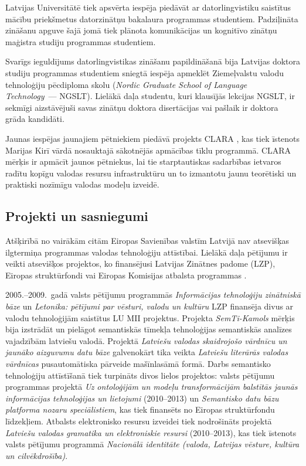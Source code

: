 \begin{multicols}{2}
Latvijas Universitātē tiek apsvērta iespēja piedāvāt ar datorlingvistiku saistītus mācību priekšmetus datorzinātņu bakalaura programmas studentiem. 
Padziļināta zināšanu apguve šajā jomā tiek plānota komunikācijas un kognitīvo zinātņu maģistra studiju programmas studentiem.

Svarīgs ieguldījums datorlingvistikas zināšanu papildināšanā bija Latvijas doktora studiju programmas studentiem sniegtā iespēja apmeklēt Ziemeļvalstu valodu tehnoloģiju pēcdiploma skolu (\textit{Nordic Graduate School of Language Technology}~--- NGSLT). Lielākā daļa studentu, kuri klausījās lekcijas NGSLT, ir sekmīgi aizstāvējuši savas zinātņu doktora disertācijas vai pašlaik ir doktora grāda kandidāti.

Jaunas iespējas jaunajiem pētniekiem piedāvā projekts CLARA \cite{Meta38}, kas tiek īstenots Marijas Kirī vārdā nosauktajā sākotnējās apmācības tīklu pro\-grammā. 
CLARA mērķis ir apmācīt jaunos pētniekus, lai tie starptautiskas sadarbības ietvaros radītu kopīgu valodas resursu infrastruktūru un to izmantotu jaunu teorētiski un praktiski nozīmīgu valodas modeļu izveidē.

\subsection{Projekti un sasniegumi}

Atšķirībā no vairākām citām Eiropas Savienības valstīm Latvijā nav atsevišķas ilgtermiņa programmas valodas tehnoloģiju attīstībai. 
Lielākā daļa pētījumu ir veikti atsevišķos projektos, ko finansējusi Latvijas Zinātnes padome (LZP), Eiropas struktūrfondi vai Eiropas Komisijas atbalsta programmas \cite{Meta2}.

2005.--2009.~gadā valsts pētījumu programmās \textit{Informācijas tehnoloģiju zinātniskā bāze} un \textit{Letonika: pētījumi par vēsturi, valodu un kultūru} LZP finansēja divus ar valodu tehnoloģijām saistītus LU MII projektus.
Projekta \textit{SemTi-Kamols} \cite{Meta39} mērķis bija izstrādāt un pielāgot semantiskās tīmekļa tehnoloģijas semantiskās analīzes vajadzībām latviešu valodā.
Projektā \textit{Latviešu valodas skaidrojošo vārdnīcu un jaunāko aizguvumu datu bāze} galvenokārt tika veikta \textit{Latviešu literārās valodas vārdnīcas} pusautomātiska pārveide mašīnlasāmā formā.
Darbs semantisko tehnoloģiju attīstīšanā tiek turpināts divos lielos projektos: valsts pētījumu programmas projektā \textit{Uz ontoloģijām un modeļu transformācijām balstītās jaunās informācijas tehnoloģijas un lietojumi} (2010--2013) un \textit{Semantisko datu bāzu platforma nozaru speciālistiem}, kas tiek finansēts no Eiropas struktūrfondu līdzekļiem.
Atbalsts elektronisko resursu izveidei tiek nodrošināts projektā \textit{Latviešu valodas gramatika un elektroniskie resursi} (2010–2013), kas tiek īstenots valsts pētījumu programmā \textit{Nacionālā identitāte (valoda, Latvijas vēsture, kultūra un cilvēkdrošība)}.


\end{multicols}
